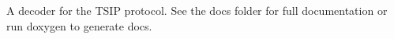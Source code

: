 A decoder for the T\+S\+IP protocol. See the docs folder for full documentation or run doxygen to generate docs. 